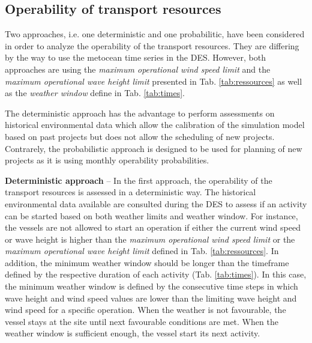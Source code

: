 \subsection{Operability of transport resources}
Two approaches, i.e. one deterministic and one probabilitic, have been considered in order to analyze the operability of the transport resources. They are differing by the way to use the metocean time series in the DES. However, both approaches are using the \textit{maximum operational wind speed limit} and the \textit{maximum operational wave height limit} presented in Tab. \ref{tab:ressources} as well as the \textit{weather window} define in Tab. \ref{tab:times}.

The deterministic approach has the advantage to perform assessments on historical environmental data which allow the calibration of the simulation model based on past projects but does not allow the scheduling of new projects. Contrarely, the probabilistic approach is designed to be used for planning of new projects as it is using monthly operability probabilities. %

\textbf{Deterministic approach} -- In the first approach, the operability of the transport resources is assessed in a deterministic way. The historical environmental data available are consulted during the DES to assess if an activity can be started based on both weather limits and weather window. For instance, the vessels are not allowed to start an operation if either the current wind speed or wave height is higher than the \textit{maximum operational wind speed limit} or the \textit{maximum operational wave height limit} defined in Tab. \ref{tab:ressources}. In addition, the minimum weather window should be longer than the timeframe defined by the respective duration of each activity (Tab. \ref{tab:times}). In this case, the minimum weather window is defined by the consecutive time steps in which wave height and wind speed values are lower than the limiting wave height and wind speed for a specific operation. When the weather is not favourable, the vessel stays at the site until next favourable conditions are met. When the weather window is sufficient enough, the vessel start its next activity. 


